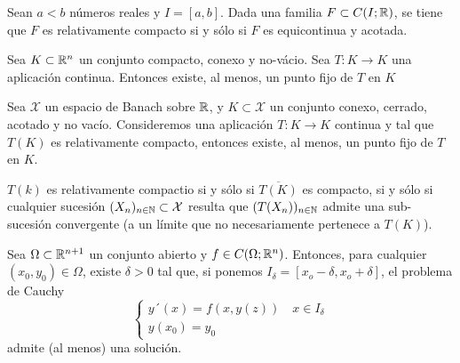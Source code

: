 \begin{theorem} 
  Sean $a<b$ números reales y $I=[a,b]$. Dada una familia $F\subset C(I;\mathbb{R})$, se tiene que $F$ es relativamente compacto si y sólo si $F$ es equicontinua y acotada.
\end{theorem}

\begin{theorem} 
  Sea $K\subset \mathbb{R}^n$ un conjunto compacto, conexo y no-vácio. Sea $T:K\rightarrow K$ una aplicación continua. Entonces existe, al menos, un punto fijo de $T$ en $K$
\end{theorem}

\begin{theorem}
  Sea $\mathcal{X}$ un espacio de Banach sobre $\mathbb{R}$, y $K\subset \mathcal{X}$ un conjunto conexo, cerrado, acotado y no vacío. Consideremos una aplicación $T:K\rightarrow K$  continua y tal que $T(K)$ es relativamente compacto, entonces existe, al menos, un punto fijo de $T$ en $K$.
\end{theorem}

\begin{remark}
  $T(k)$ es relativamente compactio si y sólo si $\overline{T(K)}$ es compacto, si y sólo si cualquier sucesión $(X_n)_{n\in \mathbb{N}}\subset \mathcal{X}$ resulta que $(T(X_n))_{n\in \mathbb{N}}$ admite una sub-sucesión convergente (a un límite que no necesariamente pertenece a $T(K)$).
\end{remark}
\begin{theorem}[Peano] Sea $\Omega \subset \mathbb{R}^{n+1}$ un conjunto abierto y $f \in C(\Omega;\mathbb{R}^n)$. Entonces, para cualquier $(x_0,y_0)\in \Omega$, existe $\delta>0$ tal que, si ponemos $I_{\delta}=[x_o-\delta,x_o+\delta]$, el problema de Cauchy
  \[
    \begin{cases}
      y´(x)=f(x,y(z)) \quad x \in I_{\delta} \\ y(x_0)=y_0
    \end{cases}
  \]
  admite (al menos) una solución.
\end{theorem}

